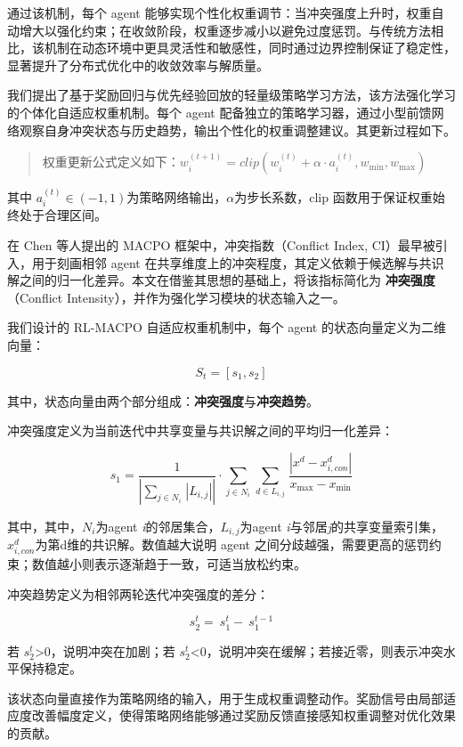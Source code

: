 \documentclass[12pt]{ctexart}
\begin{document}
通过该机制，每个 agent
能够实现个性化权重调节：当冲突强度上升时，权重自动增大以强化约束；在收敛阶段，权重逐步减小以避免过度惩罚。与传统方法相比，该机制在动态环境中更具灵活性和敏感性，同时通过边界控制保证了稳定性，显著提升了分布式优化中的收敛效率与解质量。

我们提出了基于奖励回归与优先经验回放的轻量级策略学习方法，该方法强化学习的个体化自适应权重机制。每个
agent
配备独立的策略学习器，通过小型前馈网络观察自身冲突状态与历史趋势，输出个性化的权重调整建议。其更新过程如下。

\begin{quote}
权重更新公式定义如下：\(w_{i}^{(t + 1)} = clip\left( w_{i}^{(t)} + \alpha \cdot a_{i}^{(t)},w_{\min},w_{\max} \right)\)
\end{quote}

其中
\(a_{i}^{(t)} \in ( - 1,1)\)为策略网络输出，\(\alpha\)为步长系数，clip
函数用于保证权重始终处于合理区间。

在 Chen 等人提出的 MACPO 框架中，冲突指数（Conflict Index,
CI）最早被引入，用于刻画相邻 agent
在共享维度上的冲突程度，其定义依赖于候选解与共识解之间的归一化差异。本文在借鉴其思想的基础上，将该指标简化为
\textbf{冲突强度}（Conflict
Intensity），并作为强化学习模块的状态输入之一。

我们设计的 RL-MACPO 自适应权重机制中，每个 agent
的状态向量定义为二维向量：

\[S_{t} = \left\lbrack s_{1},s_{2} \right\rbrack\]

其中，状态向量由两个部分组成：\textbf{冲突强度}与\textbf{冲突趋势}。

冲突强度定义为当前迭代中共享变量与共识解之间的平均归一化差异：

\[s_{1} = \frac{1}{\left| \sum_{j \in N_{i}}^{}\mspace{2mu} |L_{i,j}| \right|} \cdot \sum_{j \in N_{i}}^{}\mspace{2mu}\sum_{d \in L_{i,j}}^{}\mspace{2mu}\frac{|x^{d} - x_{i,con}^{d}|}{x_{\max} - x_{\min}}\]

其中，其中，\(N_{i}\)为agent \emph{i}的邻居集合，\(L_{i,j}\)为agent
\emph{i}与邻居\emph{j}的共享变量索引集，\(x_{i,con}^{d}\)为第d维的共识解。数值越大说明
agent
之间分歧越强，需要更高的惩罚约束；数值越小则表示逐渐趋于一致，可适当放松约束。

冲突趋势定义为相邻两轮迭代冲突强度的差分：

\[s_{2}^{t} = \ s_{1}^{t} - \ s_{1}^{t - 1}\]

若 \(s_{2}^{t}\)\textgreater0，说明冲突在加剧；若
\(s_{2}^{t}\)\textless0，说明冲突在缓解；若接近零，则表示冲突水平保持稳定。

该状态向量直接作为策略网络的输入，用于生成权重调整动作。奖励信号由局部适应度改善幅度定义，使得策略网络能够通过奖励反馈直接感知权重调整对优化效果的贡献。
\end{document}
